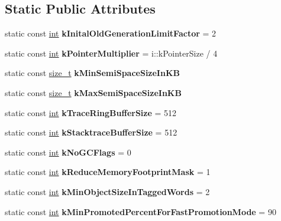 \subsection*{Static Public Attributes}
\begin{DoxyCompactItemize}
\item 
\mbox{\label{classv8_1_1internal_1_1Heap_a283b1320088df8b32025b51589c15be0}} 
static const \mbox{\hyperlink{classint}{int}} {\bfseries k\+Inital\+Old\+Generation\+Limit\+Factor} = 2
\item 
\mbox{\label{classv8_1_1internal_1_1Heap_ad066a03f343d821140af2c59eb65dd0c}} 
static const \mbox{\hyperlink{classint}{int}} {\bfseries k\+Pointer\+Multiplier} = i\+::k\+Pointer\+Size / 4
\item 
static const \mbox{\hyperlink{classsize__t}{size\+\_\+t}} {\bfseries k\+Min\+Semi\+Space\+Size\+In\+KB}
\item 
static const \mbox{\hyperlink{classsize__t}{size\+\_\+t}} {\bfseries k\+Max\+Semi\+Space\+Size\+In\+KB}
\item 
\mbox{\label{classv8_1_1internal_1_1Heap_a90e80e6badeb4b3c1e6d2ae51b00a064}} 
static const \mbox{\hyperlink{classint}{int}} {\bfseries k\+Trace\+Ring\+Buffer\+Size} = 512
\item 
\mbox{\label{classv8_1_1internal_1_1Heap_a7f001c17ec007b810c5dbf8f073bf291}} 
static const \mbox{\hyperlink{classint}{int}} {\bfseries k\+Stacktrace\+Buffer\+Size} = 512
\item 
\mbox{\label{classv8_1_1internal_1_1Heap_a961837df65c137b572023585c5c72191}} 
static const \mbox{\hyperlink{classint}{int}} {\bfseries k\+No\+G\+C\+Flags} = 0
\item 
\mbox{\label{classv8_1_1internal_1_1Heap_a1792e93ed5d827373c21b9a99bc19c54}} 
static const \mbox{\hyperlink{classint}{int}} {\bfseries k\+Reduce\+Memory\+Footprint\+Mask} = 1
\item 
\mbox{\label{classv8_1_1internal_1_1Heap_a4ee1e8fd2bd2c0353a24c1111ed9bf7b}} 
static const \mbox{\hyperlink{classint}{int}} {\bfseries k\+Min\+Object\+Size\+In\+Tagged\+Words} = 2
\item 
\mbox{\label{classv8_1_1internal_1_1Heap_a959f97a87290c89957c91770532ce771}} 
static const \mbox{\hyperlink{classint}{int}} {\bfseries k\+Min\+Promoted\+Percent\+For\+Fast\+Promotion\+Mode} = 90
\end{DoxyCompactItemize}
